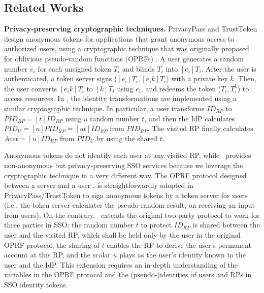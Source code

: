 \subsection{Related Works}
\label{sec:related}

%

\newc
\noindent\textbf{Privacy-preserving cryptographic techniques.}
PrivacyPass and TrustToken \cite{privacypass,trusttoken} design anonymous tokens for applications that grant anonymous access to authorized users, using a cryptographic technique that was originally proposed for oblivious pseudo-random functions (OPRFs) \cite{oprf-proved,voprf-proved,oprf-bitcoin-wallet}.
A user generates a random number $e_i$ for each unsigned token $T_i$ and blinds $T_i$ into $[e_i]T_i$.
After the user is authenticated, a token server signs ($[e_i]T_i, [e_i k]T_i$) with a private key $k$. Then, the user converts $[e_i k]T_i$ to $[k]T_i$ using $e_i$, and redeems the token ($T_i, T_i^k$) to access resources.
In \usso, the identity transformations are implemented using a similar cryptographic technique.
In particular, a user transforms $ID_{RP}$ to $PID_{RP} = [t]ID_{RP}$ using a random number $t$,
 and then the IdP calculates $PID_U = [u]PID_{RP} = [ut]ID_{RP}$ from $PID_{RP}$.
 The visited RP finally calculates $Acct = [u]ID_{RP}$ from $PID_{U}$ by using the shared $t$.

Anonymous tokens \cite{privacypass,trusttoken} do not identify each user at any visited RP,
    while \usso\ provides non-anonymous but privacy-preserving SSO services because we leverage the cryptographic technique in a very different way.
The OPRF protocol designed between a server and a user \cite{oprf-proved,voprf-proved,oprf-bitcoin-wallet},
    is straightforwardly adopted in PrivacyPass/TrustToken to sign anonymous tokens by a token server for users
        (i.e., the token server calculates the pseudo-random result, on receiving an input from users).
On the contrary, \usso\ extends the original two-party protocol to work for three parties in SSO:
        the random number $t$ to protect $ID_{RP}$ is shared between the user and the visited RP,
            which shall be held only by the user in the original OPRF protocol,
                the sharing of $t$ enables the RP to derive the user's permanent account at this RP,
        and the scalar $u$ plays as the user's identity known to the user and the IdP.
This extension requires an in-depth understanding of the variables in the OPRF protocol and the (pseudo-)identities of users and RPs in SSO identity tokens.

